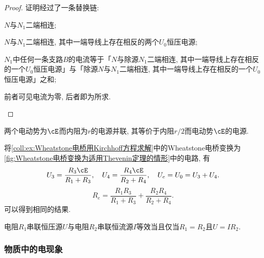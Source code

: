 \documentclass[../Electromagnetism.tex]{subfiles}
\begin{document}
\begin{proof}
	证明经过了一条替换链:
	\begin{cenum}
		\item $N$与$N_1$二端相连;
		\item $N$与$N_1$二端相连, 其中一端导线上存在相反的两个$U_0$恒压电源;
		\item $N_1$中任何一条支路$B$的电流等于「$N$与除源$N_1$二端相连, 其中一端导线上存在相反的一个$U_0$恒压电源」与「除源$N$与$N_1$二端相连, 其中一端导线上存在相反的一个$U_0$恒压电源」之和;
		\item 前者可见电流为零, 后者即为所求.\qedhere
	\end{cenum}
\end{proof}
\begin{ex}
	两个电动势为$\cE$而内阻为$r$的电源并联, 其等价于内阻$r/2$而电动势$\cE$的电源.
\end{ex}
\begin{ex}
	将\cref{coll:ex:Wheatstone电桥用Kirchhoff方程求解}中的Wheatstone电桥变换为\cref{fig:Wheatstone电桥变换为适用Thevenin定理的情形}中的电路, 有
	\[ U_3 = \frac{R_3 \cE}{R_1 + R_3},\quad U_4 = \frac{R_4 \cE}{R_2 + R_4}, \quad U_e = U_0 = U_3 + U_4. \]
	\[ R_e = \frac{R_1R_3}{R_1 + R_3} + \frac{R_2 R_4}{R_2 + R_4}. \]
	可以得到相同的结果.
\end{ex}
\begin{theorem}[恒流电源与恒压电源的等效]
	电阻$R_1$串联恒压源$U$与电阻$R_2$串联恒流源$I$等效当且仅当$R_1 = R_2$且$U = IR_2$.
\end{theorem}


\subsubsection{物质中的电现象} %
\label{ssub:物质中的电现象}
\end{document}
